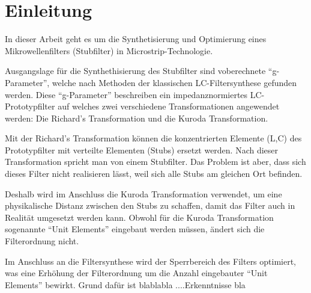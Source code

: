 \section{Einleitung}

In dieser  Arbeit  geht es um die Synthetisierung und Optimierung
eines Mikrowellenfilters (Stubfilter) in Microstrip-Technologie.

Ausgangslage für die Synthethisierung des Stubfilter sind voberechnete ``g-Parameter'', welche nach Methoden der klassischen LC-Filtersynthese gefunden werden. Diese ``g-Parameter'' beschreiben ein impedanznormiertes LC-Prototypfilter auf welches zwei verschiedene  Transformationen
angewendet werden: Die Richard's Transformation und die Kuroda Transformation.

Mit der Richard's Transformation können die konzentrierten Elemente (L,C) des Prototypfilter mit verteilte Elementen (Stubs) ersetzt werden. Nach dieser Transformation spricht man von einem Stubfilter. Das Problem ist aber, dass sich dieses Filter nicht realisieren lässt, weil sich alle Stubs am gleichen Ort befinden. 

Deshalb wird im Anschluss die Kuroda Transformation verwendet,  um eine physikalische Distanz zwischen
den  Stubs  zu  schaffen, damit das Filter auch in Realit\"at umgesetzt  werden  kann. Obwohl für die Kuroda Transformation sogenannte ``Unit Elements'' eingebaut werden müssen, ändert sich die Filterordnung nicht.

Im Anschluss an die Filtersynthese wird der Sperrbereich des Filters optimiert, was eine Erhöhung der Filterordnung um die Anzahl eingebauter ``Unit Elements'' bewirkt. Grund dafür ist blablabla ....Erkenntnisse bla

\newpage





